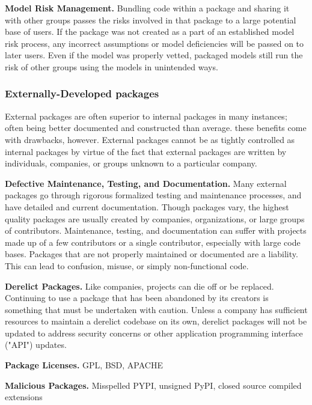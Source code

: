                 \textbf{Model Risk Management.}
                Bundling code within a package and sharing it with other groups passes the risks involved in that package to a large potential base of users. If the package was not created as a part of an established model risk process, any incorrect assumptions or model deficiencies will be passed on to later users. Even if the model was properly vetted, packaged models still run the risk of other groups using the models in unintended ways. 
                
            \subsubsection{Externally-Developed packages}

                External packages are often superior to internal packages in many instances; often being better documented and constructed than average. these benefits come with drawbacks, however. External packages cannot be as tightly controlled as internal packages by virtue of the fact that external packages are written by individuals, companies, or groups unknown to a particular company.

                \textbf{Defective Maintenance, Testing, and Documentation.}
                Many external packages go through rigorous formalized testing and maintenance processes, and have detailed and current documentation. Though packages vary, the highest quality packages are usually created by companies, organizations, or large groups of contributors. Maintenance, testing, and documentation can suffer with projects made up of a few contributors or a single contributor, especially with large code bases. Packages that are not properly maintained or documented are a liability. This can lead to confusion, misuse, or simply non-functional code.

                \textbf{Derelict Packages.}
                Like companies, projects can die off or be replaced. Continuing to use a package that has been abandoned by its creators is something that must be undertaken with caution. Unless a company has sufficient resources to maintain a derelict codebase on its own, derelict packages will not be updated to address security concerns or other application programming interface ("API") updates.

                \textbf{Package Licenses.}
                GPL, BSD, APACHE

                \textbf{Malicious Packages.}
                Misspelled PYPI, unsigned PyPI, closed source compiled extensions

